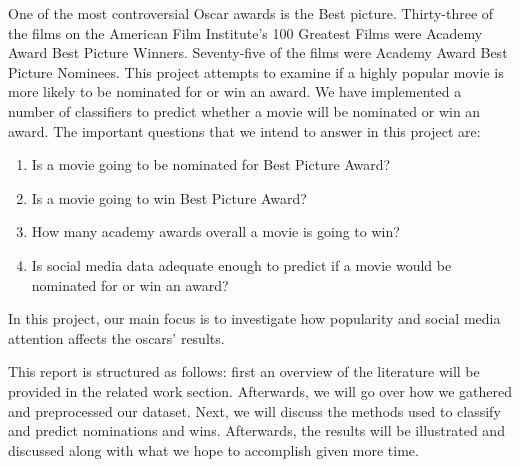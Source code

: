 \documentclass[journal,transmag]{IEEEtran}
\begin{document}
	One of the most controversial Oscar awards is the Best picture.
	Thirty-three of the films on the American Film Institute’s 100 Greatest Films were Academy Award Best Picture Winners.
	Seventy-five of the films were Academy Award Best Picture Nominees\cite{maryamref20}.
	This project attempts to examine if a highly popular movie is more likely to be nominated for or win an award.  We have implemented a number of classifiers to predict whether a movie will be nominated or win an award. The important questions that we intend to answer in this project are:	
	\begin{enumerate}
		\item Is a movie going to be nominated for Best Picture Award?
		\item Is a movie going to win Best Picture Award?
		\item How many academy awards overall a movie is going to win?
		\item Is social media data adequate enough to predict if a movie would be nominated for or win an award?
	\end{enumerate}	
	In this project, our main focus is to investigate how popularity and social media attention affects the oscars' results.
	\par
	This report is structured as follows: first an overview of the literature will be provided in the related work section. Afterwards, we will go over how we gathered and preprocessed our dataset. Next, we will discuss the methods used to classify and predict nominations and wins. Afterwards, the results will be illustrated and discussed along with what we hope to accomplish given more time.
	
\end{document}
